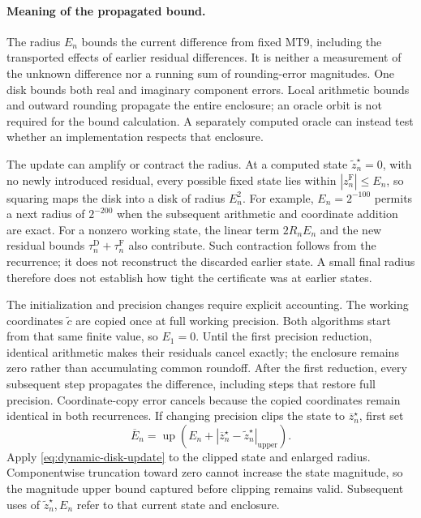 \paragraph{Meaning of the propagated bound.}
The radius $E_n$ bounds the current difference from fixed MT9, including the
transported effects of earlier residual differences. It is neither a measurement
of the unknown difference nor a running sum of rounding-error magnitudes.
One disk bounds both real and imaginary component errors. Local arithmetic
bounds and outward rounding propagate the entire enclosure; an oracle orbit
is not required for the bound calculation. A separately computed oracle can
instead test whether an implementation respects that enclosure.

The update can amplify or contract the radius. At a computed state
$\widetilde z_n^\star=0$, with no newly introduced residual, every possible
fixed state lies within $|z_n^{\mathrm F}|\le E_n$, so squaring maps the disk into a
disk of radius $E_n^2$. For example, $E_n=2^{-100}$ permits a next radius of
$2^{-200}$ when the subsequent arithmetic and coordinate addition are exact.
For a nonzero working state, the linear term $2R_nE_n$ and the new residual
bounds $\tau_n^{\mathrm D}+\tau_n^{\mathrm F}$ also contribute. Such contraction
follows from the recurrence;
it does not reconstruct the discarded earlier state. A small final radius
therefore does not establish how tight the certificate was at earlier states.

The initialization and precision changes require explicit accounting. The
working coordinates $\widetilde c$ are copied once at full working precision.
Both algorithms start from that same finite value, so $E_1=0$. Until the first
precision reduction, identical arithmetic makes their residuals cancel exactly;
the enclosure remains zero rather than accumulating common roundoff.
After the first reduction, every subsequent step propagates the difference,
including steps that restore full precision. Coordinate-copy error cancels
because the copied coordinates remain identical in both recurrences.
If changing precision clips the state to $\overline z_n^\star$, first set
\[
 \overline E_n=\operatorname{up}
   (E_n+|\overline z_n^\star-\widetilde z_n^\star|_{\mathrm{upper}}).
\]
Apply \eqref{eq:dynamic-disk-update} to the clipped state and enlarged radius.
Componentwise truncation toward zero cannot increase the state magnitude, so
the magnitude upper bound captured before clipping remains valid. Subsequent
uses of $\widetilde z_n^\star,E_n$ refer to that current state and enclosure.

